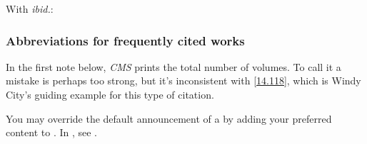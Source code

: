 \documentclass[11pt,letterpaper,oneside]{article}
\begin{document}
\noindent With \textit{ibid.}:

\begin{citeonly}
\item \cite[3]{morrison2004a}
\item \cite[18]{morrison2004a}
\item \cite[18]{morrison2004a}
\item \cite[24--26]{morrison2004a}
\item \cite[401-2]{morrison2004b}
\item \cite[433]{morrison2004b}
\item \cite[37--38]{diaz2008}
\item \cite[403]{morrison2004b}
\item \cite[152]{diaz2008}
\item \cite[201-2]{diaz2008}
\item \cites[240]{morrison2004b}[32]{morrison2004a}
\item \cite[33]{morrison2004a}
\end{citeonly}

\setcounter{subsubsection}{58}
\subsubsection{Abbreviations for frequently cited works}
\label{14.59}

In the first note below, \textit{CMS} prints the total number of
volumes. To call it a mistake is perhaps too strong, but it's
inconsistent with \ref{14.118}, which is Windy City's guiding example
for this type of citation.

You may override the default announcement of a  by
adding your preferred content to . In
, see .
\end{document}
